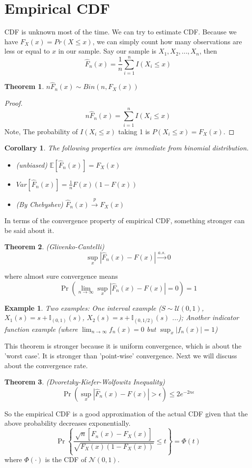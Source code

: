 \documentclass[twoside]{article}
\newtheorem*{theorem*}{Theorem}
\newtheorem*{corollary*}{Corollary}
\newtheorem*{example*}{Example}
\begin{document}
	\section{Empirical CDF}
	CDF is unknown most of the time. We can try to estimate CDF. Because we have $F_X(x) = Pr(X \leqslant x)$, we can simply count how many observations are less or equal to $x$ in our sample. Say our sample is $X_1, X_2, ..., X_n$, then
	$$
	\hat{F}_n(x) = \frac{1}{n} \sum_{i=1}^n I(X_i \leqslant x)
	$$
	\begin{theorem*}
		$n \hat{F}_n(x) \sim Bin \left( n, F_X(x) \right)$
	\end{theorem*}

	\begin{proof}
		$$n \hat{F}_n(x) = \sum_{i=1}^n I(X_i \leqslant x)$$
		Note, The probability of $I(X_i \leqslant x) $ taking 1 is $P(X_i \leqslant x) = F_X(x).$
	\end{proof}
	
	\begin{corollary*} The following properties are immediate from binomial distribution. 
		\begin{itemize}
			\item[1] (unbiased) $\mathbb{E} [\hat{F}_n (x)] = F_X(x)$
			\item[2] $Var[\hat{F}_n (x)] = \frac{1}{n} F(x) \left( 1 - F(x) \right)$
			\item[3] (By Chebyshev) $\hat{F} _n (x) \xrightarrow{p} F_X(x)$
		\end{itemize}
	\end{corollary*}
	In terms of the convergence property of empirical CDF, something stronger can be said about it. 
	\begin{theorem*}
		(Glivenko-Cantelli) 
		$$
		\sup\limits_{x} |\hat{F}_n (x) - F(x)| \xrightarrow{a.s.} 0
		$$
	\end{theorem*}
	where almost sure convergence means
	$$
	\Pr \left( \lim\limits_{n \to \infty} \sup\limits_{x} |\hat{F}_n (x) - F(x)| = 0 \right) = 1
	$$
	\begin{example*}
		Two examples: One interval example ($S \sim \mathcal{U}(0,1)$, $X_1(s) = s + \mathbb{I}_{(0,1)}(s)$, $X_2(s) = s + \mathbb{I}_{(0, 1/2)}(s)$ ...); Another indicator function example (where $\lim_{n \to \infty} f_n(x) = 0$ but $\sup_x |f_n(x)| = 1$)
	\end{example*}
	This theorem is stronger because it is uniform convergence, which is about the 'worst case'. It is stronger than 'point-wise' convergence. Next we will discuss about the convergence rate. 
	\begin{theorem*}
		(Dvoretzky-Kiefer-Wolfowitz Inequality)
		$$
		\Pr \left( \sup\limits_{x} |\hat{F}_n (x) - F(x)| > \epsilon \right) \leqslant 2 e^{- 2n \epsilon}
		$$
	\end{theorem*}
	So the empirical CDF is a good approximation of the actual CDF given that the above probability decreases exponentially. 
	$$
	\Pr \left\{ \frac{\sqrt{n} \left[ \hat{F}_n (x) - F_X(x) \right]}{\sqrt{F_X (x) \left( 1 - F_X(x) \right)}} \leqslant t \right\} = \Phi(t)
	$$
	where $\Phi(\cdot)$ is the CDF of $\mathcal{N}(0,1)$. 
	
\end{document}
